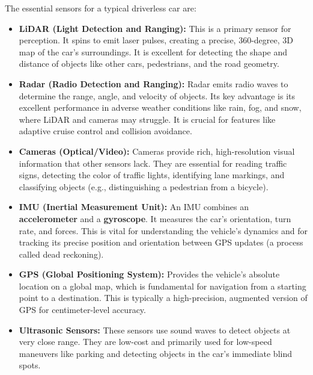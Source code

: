 \documentclass[a4paper,12pt]{article}
\begin{document}
The essential sensors for a typical driverless car are:
\begin{itemize}
    \item \textbf{LiDAR (Light Detection and Ranging):} This is a primary sensor for perception. It spins to emit laser pulses, creating a precise, 360-degree, 3D map of the car's surroundings. It is excellent for detecting the shape and distance of objects like other cars, pedestrians, and the road geometry. 
    \item \textbf{Radar (Radio Detection and Ranging):} Radar emits radio waves to determine the range, angle, and velocity of objects. Its key advantage is its excellent performance in adverse weather conditions like rain, fog, and snow, where LiDAR and cameras may struggle. It is crucial for features like adaptive cruise control and collision avoidance. 
    \item \textbf{Cameras (Optical/Video):} Cameras provide rich, high-resolution visual information that other sensors lack. They are essential for reading traffic signs, detecting the color of traffic lights, identifying lane markings, and classifying objects (e.g., distinguishing a pedestrian from a bicycle). 
    \item \textbf{IMU (Inertial Measurement Unit):} An IMU combines an \textbf{accelerometer} and a \textbf{gyroscope}. It measures the car's orientation, turn rate, and forces. This is vital for understanding the vehicle's dynamics and for tracking its precise position and orientation between GPS updates (a process called dead reckoning). 
    \item \textbf{GPS (Global Positioning System):} Provides the vehicle's absolute location on a global map, which is fundamental for navigation from a starting point to a destination. This is typically a high-precision, augmented version of GPS for centimeter-level accuracy. 
    \item \textbf{Ultrasonic Sensors:} These sensors use sound waves to detect objects at very close range. They are low-cost and primarily used for low-speed maneuvers like parking and detecting objects in the car's immediate blind spots. 
\end{itemize}
\end{document}

